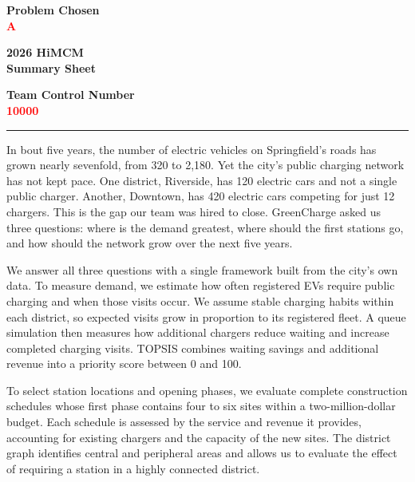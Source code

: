 \documentclass[12pt]{article}
\begin{document}
\thispagestyle{empty}

\vspace*{-20pt}
\noindent
\begin{minipage}[c]{0.32\textwidth}
\centering
\textbf{Problem Chosen}\\[3pt]
{\Large\textcolor{red}{\textbf{A}}}
\end{minipage}%
\begin{minipage}[c]{0.34\textwidth}
\centering
\textbf{2026 HiMCM}\\[3pt]
\textbf{Summary Sheet}
\end{minipage}%
\begin{minipage}[c]{0.34\textwidth}
\centering
\textbf{Team Control Number}\\[3pt]
{\Large\textcolor{red}{\textbf{10000}}}
\end{minipage}

\vspace{6pt}
\hrule
\vspace{12pt}

In bout five years, the number of electric vehicles on Springfield's roads has grown nearly
sevenfold, from 320 to 2,180. Yet the city's public charging network has not kept pace.
One district, Riverside, has 120 electric cars and not a single public charger. Another,
Downtown, has 420 electric cars competing for just 12 chargers. This is the gap our team
was hired to close. GreenCharge asked us three questions: where is the demand greatest,
where should the first stations go, and how should the network grow over the next five
years.

We answer all three questions with a single framework built from the city's own data.
To measure demand, we estimate how often registered EVs require public charging and
when those visits occur. We assume stable charging habits within each district, so
expected visits grow in proportion to its registered fleet. A queue simulation then
measures how additional chargers reduce waiting and increase completed charging visits.
TOPSIS combines waiting savings and additional revenue into a priority score between
0 and 100.

To select station locations and opening phases, we evaluate complete construction
schedules whose first phase contains four to six sites within a two-million-dollar budget. Each schedule is assessed by the service and
revenue it provides, accounting for existing chargers and the capacity of the new sites.
The district graph identifies central and peripheral areas and allows us to evaluate
the effect of requiring a station in a highly connected district.
\end{document}

